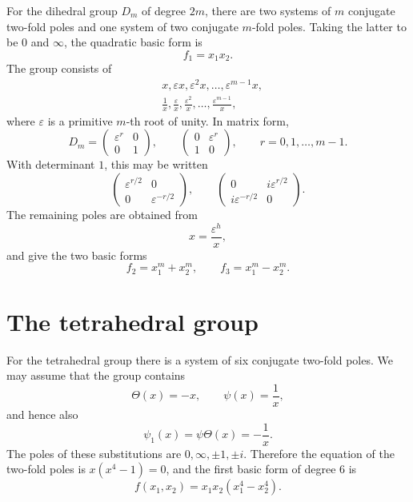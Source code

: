 \documentclass[11pt,a4paper]{book}
\begin{document}
For the dihedral group $D_m$ of degree $2m$, there are two systems of $m$ conjugate two-fold poles and one system of two conjugate $m$-fold poles.  Taking the latter to be $0$ and $\infty$, the quadratic basic form is
\[
 f_1=x_1x_2.
\]
The group consists of
\begin{align*}
 &x,\varepsilon x,\varepsilon^2x,\ldots,\varepsilon^{m-1}x,\\
 &\frac1x,\frac{\varepsilon}{x},\frac{\varepsilon^2}{x},\ldots,\frac{\varepsilon^{m-1}}x,
\end{align*}
where $\varepsilon$ is a primitive $m$-th root of unity.  In matrix form,
\begin{equation}\label{eq:w9-Dm}
 D_m=
 \begin{pmatrix}\varepsilon^r&0\\0&1\end{pmatrix},
 \qquad
 \begin{pmatrix}0&\varepsilon^r\\1&0\end{pmatrix},
 \qquad r=0,1,\ldots,m-1.
\end{equation}
With determinant $1$, this may be written
\begin{equation}\label{eq:w9-Dm-det1}
 \begin{pmatrix}\varepsilon^{r/2}&0\\0&\varepsilon^{-r/2}\end{pmatrix},
 \qquad
 \begin{pmatrix}0&i\varepsilon^{r/2}\\ i\varepsilon^{-r/2}&0\end{pmatrix}.
\end{equation}
The remaining poles are obtained from
\[
 x=\frac{\varepsilon^h}{x},
\]
and give the two basic forms
\begin{equation}\label{eq:w9-dihedral-basic}
 f_2=x_1^m+x_2^m,
 \qquad
 f_3=x_1^m-x_2^m.
\end{equation}

\section{The tetrahedral group}

For the tetrahedral group there is a system of six conjugate two-fold poles.  We may assume that the group contains
\[
 \Theta(x)=-x,
 \qquad
 \psi(x)=\frac1x,
\]
and hence also
\[
 \psi_1(x)=\psi\Theta(x)=-\frac1x.
\]
The poles of these substitutions are $0,\infty,\pm1,\pm i$.  Therefore the equation of the two-fold poles is $x(x^4-1)=0$, and the first basic form of degree $6$ is
\begin{equation}\label{eq:w9-tet-f}
 f(x_1,x_2)=x_1x_2(x_1^4-x_2^4).
\end{equation}
\end{document}
